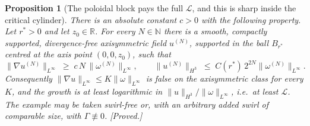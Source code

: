 \documentclass[11pt]{article}
\newtheorem{proposition}[theorem]{Proposition}
\theoremstyle{definition}
\theoremstyle{remark}
\newcommand{\R}{\mathbb{R}}
\begin{document}
\begin{proposition}[The poloidal block pays the full $\mathcal{L}$, and this
  is sharp inside the critical cylinder]\label{prop:s51-poloidal-sharp}
  There is an absolute constant $c>0$ with the following property. Let
  $r^*>0$ and let $z_0\in\R$. For every $N\in\mathbb{N}$ there is a smooth,
  compactly supported, divergence-free \emph{axisymmetric} field $u^{(N)}$,
  supported in the ball $B_{r^*}$ centred at the axis point $(0,0,z_0)$, such
  that
  \[
    \|\nabla u^{(N)}\|_{L^\infty}
    \;\geq\; c\,N\,\|\omega^{(N)}\|_{L^\infty},
    \qquad
    \|u^{(N)}\|_{H^3}\;\leq\; C(r^*)\,2^{2N}\|\omega^{(N)}\|_{L^\infty}.
  \]
  Consequently $\|\nabla u\|_{L^\infty}\leq K\|\omega\|_{L^\infty}$ is false on
  the axisymmetric class for every $K$, and the growth is at least
  logarithmic in $\|u\|_{H^3}/\|\omega\|_{L^\infty}$, i.e.\ at least
  $\mathcal{L}$. The example may be taken swirl-free or, with an arbitrary
  added swirl of comparable size, with $\Gamma\not\equiv0$. \emph{[Proved.]}
\end{proposition}
\end{document}
